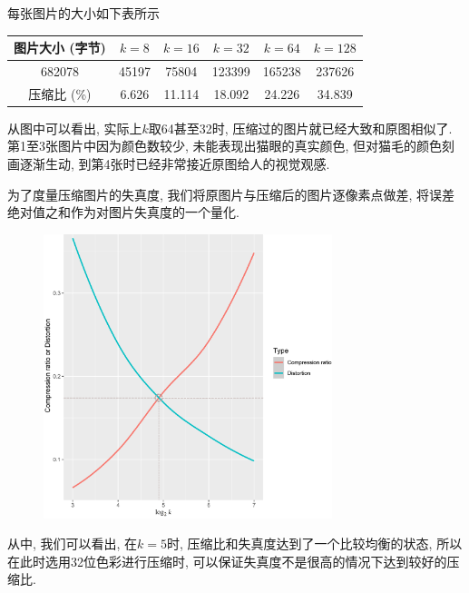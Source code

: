 \documentclass[lang=cn,11pt]{elegantpaper}
\begin{document}
每张图片的大小如下表所示
\begin{table}[h]
    \centering
    \begin{tabular}{c|ccccc}
    \hline
    图片大小 (字节)  & $k=8$   & $k=16$   & $k=32$   & $k=64$   & $k=128$  \\ \hline
    682078   & 45197 & 75804  & 123399 & 165238 & 237626 \\
    压缩比 (\%) & 6.626 & 11.114 & 18.092 & 24.226 & 34.839 \\ \hline
    \end{tabular}
\end{table}

从图中可以看出, 实际上$k$取64甚至32时, 压缩过的图片就已经大致和原图相似了. 第1至3张图片中因为颜色数较少, 未能表现出猫眼的真实颜色, 但对猫毛的颜色刻画逐渐生动, 到第4张时已经非常接近原图给人的视觉观感. 

为了度量压缩图片的失真度, 我们将原图片与压缩后的图片逐像素点做差, 将误差绝对值之和作为对图片失真度的一个量化. 

\begin{figure}[ht]
    \centering

    \hspace{50pt}\includegraphics[width=0.75\textwidth]{cat1to}
    \caption{\label{cat2tradeoff}}
\end{figure}

从中, 我们可以看出, 在$k=5$时, 压缩比和失真度达到了一个比较均衡的状态, 所以在此时选用32位色彩进行压缩时, 可以保证失真度不是很高的情况下达到较好的压缩比. 
\end{document}
